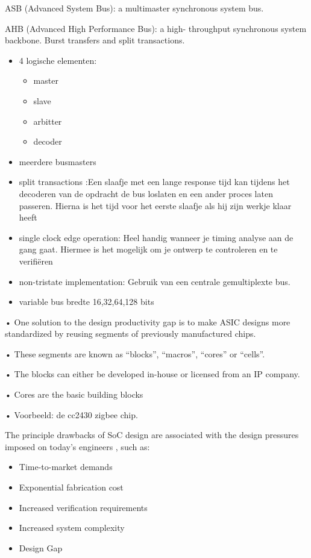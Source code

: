 ASB (Advanced System Bus): a multimaster synchronous system bus.

AHB (Advanced High Performance Bus): a high- throughput
synchronous system backbone. Burst transfers and split transactions.
\begin{itemize}
    \item 4 logische elementen:
    \begin{itemize}
        \item master
        \item slave
        \item arbitter
        \item decoder
    \end{itemize}
    \item meerdere busmasters
    \item split transactions :Een slaafje met een lange response tijd kan tijdens het decoderen van de opdracht de bus
    loslaten en een ander proces laten passeren. Hierna is het tijd voor het eerste slaafje als hij zijn
    werkje klaar heeft
    \item single clock edge operation: Heel handig wanneer je timing analyse aan de gang gaat. Hiermee is het mogelijk om je ontwerp
    te controleren en te verifiëren
    \item non-tristate implementation: Gebruik van een centrale gemultiplexte bus.
    \item variable bus bredte 16,32,64,128 bits
\end{itemize}

• One solution to the design productivity gap is to make ASIC designs
more standardized by reusing segments of previously manufactured
chips.

• These segments are known as “blocks”, “macros”, “cores” or “cells”.

• The blocks can either be developed in-house or licensed from an IP
company.

• Cores are the basic building blocks

• Voorbeeld: de cc2430 zigbee chip.

The principle drawbacks of SoC design are associated
with the design pressures imposed on today’s
engineers , such as:
\begin{itemize}
    \item Time-to-market demands
    \item Exponential fabrication cost
    \item Increased verification requirements
    \item Increased system complexity
    \item Design Gap
\end{itemize}

